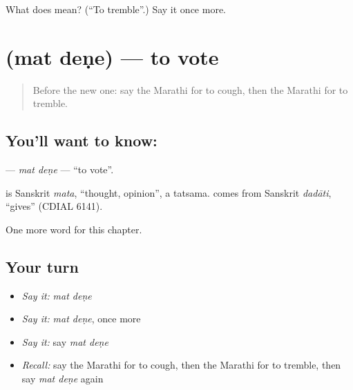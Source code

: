 \begin{tcolorbox}[breakable,colback=teal!4,colframe=teal!35!black,title={Before you move on}]
What does  mean? (\textquotedblleft{}To tremble\textquotedblright{}.) Say it once more.
\end{tcolorbox}
\section[\texorpdfstring{\mr{मत} \mr{देणे} (mat deṇe)}{मत देणे (mat deṇe)}]{  (mat deṇe) — to vote}

\label{lesson:MR-C198-mat-dene}



\begin{quote}
Before the new one: say the Marathi for to cough, then the Marathi for to tremble.
\end{quote}

\subsection*{You'll want to know:  }
\textbf{ } — \emph{mat deṇe} — \textquotedblleft{}to vote\textquotedblright{}.

\begin{cousinweb}
\textbf{} is Sanskrit \emph{mata}, \textquotedblleft{}thought, opinion\textquotedblright{}, a tatsama. \textbf{} comes from Sanskrit \emph{dadāti}, \textquotedblleft{}gives\textquotedblright{} (CDIAL 6141).
\end{cousinweb}

\begin{grammarlens}[title={What you've built}]
One more word for this chapter.
\end{grammarlens}

\subsection*{Your turn}
\begin{itemize}
\raggedright
  \item \emph{Say it:} \emph{mat deṇe}
  \item \emph{Say it:} \emph{mat deṇe}, once more
  \item \emph{Say it:} say \emph{mat deṇe}
  \item \emph{Recall:} say the Marathi for to cough, then the Marathi for to tremble, then say \emph{mat deṇe} again
\end{itemize}

